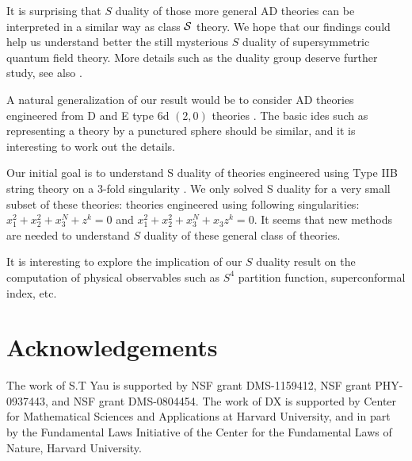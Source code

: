 \documentclass[a4paper,11pt]{article}
\begin{document}
It is surprising that $S$ duality of those more general AD theories can be interpreted in a similar way as 
class ${\cal S}$ theory. We hope that our findings  could help us understand better the still mysterious 
$S$ duality of supersymmetric quantum field theory.  More details such as the duality group deserve further study, 
see also \cite{Cecotti:2015hca,Caorsi:2016ebt}.

A natural generalization of our result would be to consider AD theories engineered from D and E type 6d $(2,0)$ theories \cite{Wang:2015mra}. 
The basic ides such as representing a theory by a punctured sphere should be similar, and it is interesting 
to work out the details. 

Our initial goal is to understand S duality of theories engineered using Type IIB string theory on 
a 3-fold singularity \cite{Shapere:1999xr,Xie:2015rpa,Chen:2016bzh,Wang:2016yha}. We only solved S duality for a very small subset of these theories:  
theories engineered using following singularities: $x_1^2+x_2^2+x_3^N+z^k=0$ and $x_1^2+x_2^2+x_3^N+x_3z^k=0$.
It seems that new methods are needed to understand $S$ duality of these general class of theories. 

It is interesting to explore the implication of our $S$ duality result on the computation of physical observables such 
as $S^4$ partition function, superconformal index, etc.


\section*{Acknowledgements}
The work of S.T Yau is supported by  NSF grant  DMS-1159412, NSF grant PHY-
0937443, and NSF grant DMS-0804454.  
The work of DX is supported by Center for Mathematical Sciences and Applications at Harvard University, and in part by the Fundamental Laws Initiative of
the Center for the Fundamental Laws of Nature, Harvard University.





\end{document}
